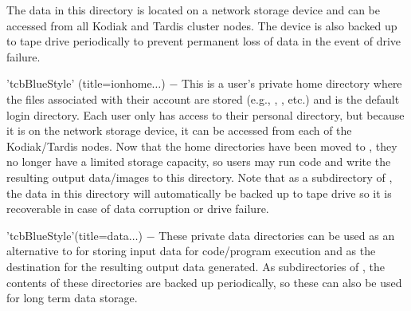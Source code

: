 \begin{tcbfunctionenv}
\begin{tcbparagraph}
\indent\indent The data in this directory is located on a network storage device and can be accessed from all Kodiak and Tardis cluster nodes.  The device is also backed up to tape drive periodically to prevent permanent loss of data in the event of drive failure.
\end{tcbparagraph}
\begin{tcbparagraph}'tcbBlueStyle'%
(title=\dirsep ion\dirsep home\dirsep\usernamelabel\dirsep$\dots$)
$\boldsymbol{-}$ This is a user's private home directory where the files associated with their account are stored (e.g., , , etc.) and is the default login directory.  Each user only has access to their personal directory, but because it is on the network storage device, it can be accessed from each of the Kodiak/Tardis nodes. Now that the home directories have been moved to , they no longer have a limited storage capacity, so users may run code and write the resulting output data/images to this directory.  Note that as a subdirectory of , the data in this directory will automatically be backed up to tape drive so it is recoverable in case of data corruption or drive failure.
\end{tcbparagraph}
\begin{tcbparagraph}'tcbBlueStyle'(title=\dirsep data\dirsep\usernamelabel\dirsep$\dots$)
$\boldsymbol{-}$ These private data directories can be used as an alternative to  for storing input data for code/program execution and as the destination for the resulting output data generated.  As subdirectories of , the contents of these directories are backed up periodically, so these can also be used for long term data storage.  

\end{tcbparagraph}
\end{tcbfunctionenv}
